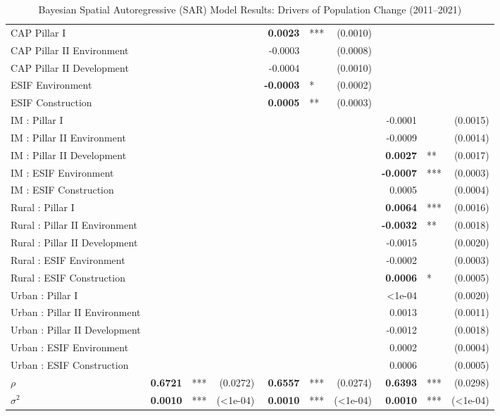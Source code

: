 \begin{table}[t]
\begin{tabular}{lrl@{~}r@{~~~~~}rl@{~}r@{~~~~~}rl@{~}r}
  CAP Pillar I &  &  &  & \textbf{0.0023} & *** & (0.0010) &  &  &  \\ 
  CAP Pillar II Environment &  &  &  & -0.0003 &  & (0.0008) &  &  &  \\ 
  CAP Pillar II Development &  &  &  & -0.0004 &  & (0.0010) &  &  &  \\ 
  ESIF Environment &  &  &  & \textbf{-0.0003} & * & (0.0002) &  &  &  \\ 
  ESIF Construction &  &  &  & \textbf{0.0005} & ** & (0.0003) &  &  &  \\ 
  IM : Pillar I &  &  &  &  &  &  & -0.0001 &  & (0.0015) \\ 
  IM : Pillar II Environment &  &  &  &  &  &  & -0.0009 &  & (0.0014) \\ 
  IM : Pillar II Development &  &  &  &  &  &  & \textbf{0.0027} & ** & (0.0017) \\ 
  IM : ESIF Environment &  &  &  &  &  &  & \textbf{-0.0007} & *** & (0.0003) \\ 
  IM : ESIF Construction &  &  &  &  &  &  & 0.0005 &  & (0.0004) \\ 
  Rural : Pillar I &  &  &  &  &  &  & \textbf{0.0064} & *** & (0.0016) \\ 
  Rural : Pillar II Environment &  &  &  &  &  &  & \textbf{-0.0032} & ** & (0.0018) \\ 
  Rural : Pillar II Development &  &  &  &  &  &  & -0.0015 &  & (0.0020) \\ 
  Rural : ESIF Environment &  &  &  &  &  &  & -0.0002 &  & (0.0003) \\ 
  Rural : ESIF Construction &  &  &  &  &  &  & \textbf{0.0006} & * & (0.0005) \\ 
  Urban : Pillar I &  &  &  &  &  &  & <1e-04 &  & (0.0020) \\ 
  Urban : Pillar II Environment &  &  &  &  &  &  & 0.0013 &  & (0.0011) \\ 
  Urban : Pillar II Development &  &  &  &  &  &  & -0.0012 &  & (0.0018) \\ 
  Urban : ESIF Environment &  &  &  &  &  &  & 0.0002 &  & (0.0004) \\ 
  Urban : ESIF Construction &  &  &  &  &  &  & 0.0006 &  & (0.0005) \\ 
   \midrule
$\rho$ & \textbf{0.6721} & *** & (0.0272) & \textbf{0.6557} & *** & (0.0274) & \textbf{0.6393} & *** & (0.0298) \\ 
  $\sigma^2$ & \textbf{0.0010} & *** & (<1e-04) & \textbf{0.0010} & *** & (<1e-04) & \textbf{0.0010} & *** & (<1e-04) \\ 
   \bottomrule
\end{tabular}
\caption{Bayesian Spatial Autoregressive (SAR) Model Results: Drivers of Population Change (2011--2021)} 
\label{tab:sar_main}
\end{table}

